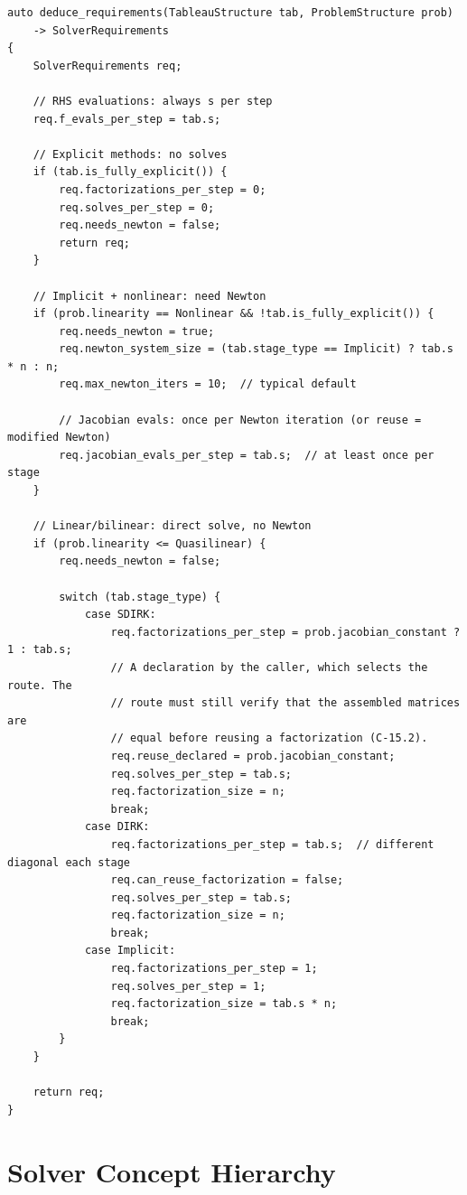 \documentclass[11pt]{article}
\begin{document}
\begin{verbatim}
auto deduce_requirements(TableauStructure tab, ProblemStructure prob) 
    -> SolverRequirements 
{
    SolverRequirements req;
    
    // RHS evaluations: always s per step
    req.f_evals_per_step = tab.s;
    
    // Explicit methods: no solves
    if (tab.is_fully_explicit()) {
        req.factorizations_per_step = 0;
        req.solves_per_step = 0;
        req.needs_newton = false;
        return req;
    }
    
    // Implicit + nonlinear: need Newton
    if (prob.linearity == Nonlinear && !tab.is_fully_explicit()) {
        req.needs_newton = true;
        req.newton_system_size = (tab.stage_type == Implicit) ? tab.s * n : n;
        req.max_newton_iters = 10;  // typical default
        
        // Jacobian evals: once per Newton iteration (or reuse = modified Newton)
        req.jacobian_evals_per_step = tab.s;  // at least once per stage
    }
    
    // Linear/bilinear: direct solve, no Newton
    if (prob.linearity <= Quasilinear) {
        req.needs_newton = false;
        
        switch (tab.stage_type) {
            case SDIRK:
                req.factorizations_per_step = prob.jacobian_constant ? 1 : tab.s;
                // A declaration by the caller, which selects the route. The
                // route must still verify that the assembled matrices are
                // equal before reusing a factorization (C-15.2).
                req.reuse_declared = prob.jacobian_constant;
                req.solves_per_step = tab.s;
                req.factorization_size = n;
                break;
            case DIRK:
                req.factorizations_per_step = tab.s;  // different diagonal each stage
                req.can_reuse_factorization = false;
                req.solves_per_step = tab.s;
                req.factorization_size = n;
                break;
            case Implicit:
                req.factorizations_per_step = 1;
                req.solves_per_step = 1;
                req.factorization_size = tab.s * n;
                break;
        }
    }
    
    return req;
}
\end{verbatim}

\section{Solver Concept Hierarchy}
\end{document}

